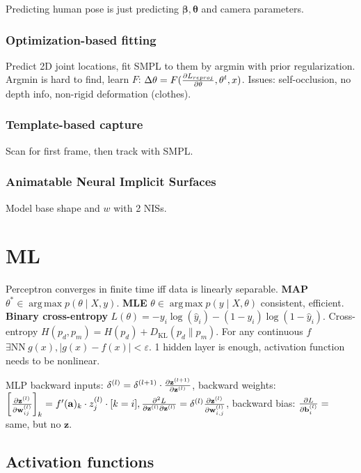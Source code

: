 \documentclass[11pt,landscape,a4paper,fleqn]{article}
\newcommand{\kl}[2]{D_{\mathrm{KL}}(#1\lVert#2)}
\DeclareMathOperator*{\argmax}{arg\,max}
\def\myvector#1{\mathbf{#1}}
\def\va{{\myvector{a}}}
\def\vb{{\myvector{b}}}
\def\vw{{\myvector{w}}}
\def\vz{{\myvector{z}}}
\begin{document}
\begin{multicols*}{4}
Predicting human pose is just predicting $\bm\beta, \bm\theta$ and camera parameters.

\subsubsection{Optimization-based fitting} Predict 2D joint locations,
fit SMPL to them by argmin with prior regularization.
Argmin is hard to find, learn $F$: $\Delta \theta = F(\pdv{L_{reproj}}{\theta}, \theta^t, x)$.
Issues: self-occlusion, no depth info, non-rigid deformation (clothes).

\subsubsection{Template-based capture}
Scan for first frame, then track with SMPL.

\subsubsection{Animatable Neural Implicit Surfaces}

Model base shape and $w$ with 2 NISs.

\section{ML}

Perceptron converges in finite time iff data is linearly separable.
\textbf{MAP} $\theta^* \in \argmax p(\theta \mid X, y)$.
\textbf{MLE} $\theta \in \argmax p(y \mid X, \theta)$ consistent, efficient.
\textbf{Binary cross-entropy} $L(\theta) = - y_i \log(\hat{y}_i) - (1 - y_i) \log(1 - \hat{y}_i)$.
Cross-entropy $H(p_d, p_m) = H(p_d) + \kl{p_d}{p_m}$.
For any continuous $f$ $\exists \mathrm{NN}\ g(x), |g(x) - f(x)| < \varepsilon$.
1 hidden layer is enough, activation function needs to be nonlinear.

MLP backward inputs: $\delta^{(l)} = \delta^{(l + 1)} \cdot \pdv{\vz^{(l + 1)}}{\vz^{(l)}}$,
backward weights: $\left[\pdv{\vz^{(l)}}{\vw_{ij}^{(l)}}\right]_k = f'(\va)_k \cdot z_j^{(l)} \cdot [k = i],
\pdv{L}{\vz^{(l)}}{\vz^{(l)}} = \delta^{(l)} \pdv{\vz^{(l)}}{\vw_{i,j}^{(l)}}$,
backward bias: $\pdv{L}{\vb_i^{(l)}} =$ same, but no $\vz$.

\subsection{Activation functions} \phantom{a}


\end{multicols*}
\end{document}
